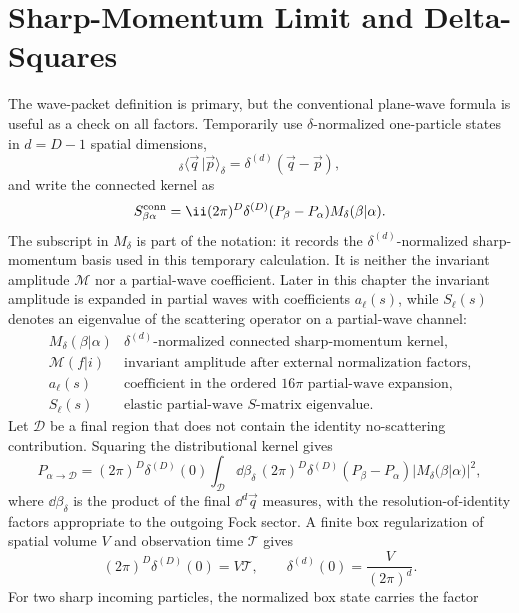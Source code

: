 \section{Sharp-Momentum Limit and Delta-Squares}

\begin{example}
\label{ex:sharp-momentum-density-limit-cross-section}
The wave-packet definition is primary, but the conventional plane-wave formula
is useful as a check on all factors.  Temporarily use
\(\delta\)-normalized one-particle states in \(d=D-1\) spatial dimensions,
\[
  {}_\delta\langle \vec q\,|\vec p\rangle_\delta
  =
  \delta^{(d)}(\vec q-\vec p),
\]
and write the connected kernel as
\[
  S^{\rm conn}_{\beta\alpha}
  =
  \ii(2\pi)^D\delta^{(D)}(P_\beta-P_\alpha)M_\delta(\beta|\alpha).
\]
The subscript in \(M_\delta\) is part of the notation: it records the
\(\delta^{(d)}\)-normalized sharp-momentum basis used in this temporary
calculation.  It is neither the invariant amplitude \(\mathcal M\) nor a
partial-wave coefficient.  Later in this chapter the invariant amplitude is
expanded in partial waves with coefficients \(a_\ell(s)\), while \(S_\ell(s)\)
denotes an eigenvalue of the scattering operator on a partial-wave channel:
\[
\begin{array}{c|l}
  M_\delta(\beta|\alpha)
    & \delta^{(d)}\text{-normalized connected sharp-momentum kernel},\\
  \mathcal M(f|i)
    & \text{invariant amplitude after external normalization factors},\\
  a_\ell(s)
    & \text{coefficient in the ordered }16\pi\text{ partial-wave expansion},\\
  S_\ell(s)
    & \text{elastic partial-wave }S\text{-matrix eigenvalue}.
\end{array}
\]
Let \(\mathcal D\) be a final region that does not contain the identity
no-scattering contribution.  Squaring the distributional kernel gives
\[
  P_{\alpha\to\mathcal D}
  =
  (2\pi)^D\delta^{(D)}(0)
  \int_{\mathcal D}\dd\beta_\delta\,
  (2\pi)^D\delta^{(D)}(P_\beta-P_\alpha)
  |M_\delta(\beta|\alpha)|^2 ,
\]
where \(\dd\beta_\delta\) is the product of the final \(\dd^d\vec q\) measures,
with the resolution-of-identity factors appropriate to the outgoing Fock
sector.  A finite box
regularization of spatial volume \(V\) and observation time \(\mathcal T\) gives
\[
  (2\pi)^D\delta^{(D)}(0)=V\mathcal T,
  \qquad
  \delta^{(d)}(0)=\frac{V}{(2\pi)^d}.
\]
For two sharp incoming particles, the normalized box state carries the factor

\end{example}
